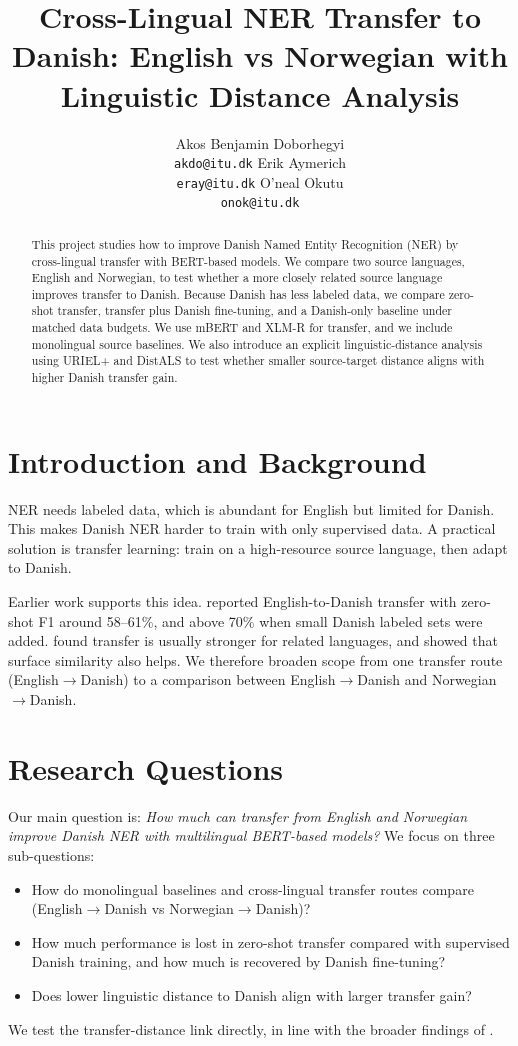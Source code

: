 \documentclass[11pt]{article}
\title{Cross-Lingual NER Transfer to Danish: English vs Norwegian with Linguistic Distance Analysis}
\author{Akos Benjamin Doborhegyi \\
  \texttt{akdo@itu.dk} \And
  Erik Aymerich \\
  \texttt{eray@itu.dk} \And
  O'neal Okutu \\
  \texttt{onok@itu.dk}}
\begin{document}
\maketitle

\begin{abstract}
This project studies how to improve Danish Named Entity Recognition (NER) by cross-lingual transfer with BERT-based models. We compare two source languages, English and Norwegian, to test whether a more closely related source language improves transfer to Danish. Because Danish has less labeled data, we compare zero-shot transfer, transfer plus Danish fine-tuning, and a Danish-only baseline under matched data budgets. We use mBERT and XLM-R for transfer, and we include monolingual source baselines. We also introduce an explicit linguistic-distance analysis using URIEL+ and DistALS to test whether smaller source-target distance aligns with higher Danish transfer gain.
\end{abstract}

\section{Introduction and Background}
NER needs labeled data, which is abundant for English but limited for Danish. This makes Danish NER harder to train with only supervised data. A practical solution is transfer learning: train on a high-resource source language, then adapt to Danish.

Earlier work supports this idea. \citet{plank2020danish} reported English-to-Danish transfer with zero-shot F1 around 58--61\%, and above 70\% when small Danish labeled sets were added. \citet{fu2023heterogeneous} found transfer is usually stronger for related languages, and \citet{sohn2024zeroshot} showed that surface similarity also helps. We therefore broaden scope from one transfer route (English$\rightarrow$Danish) to a comparison between English$\rightarrow$Danish and Norwegian$\rightarrow$Danish.

\section{Research Questions}
Our main question is: \textit{How much can transfer from English and Norwegian improve Danish NER with multilingual BERT-based models?} We focus on three sub-questions:
\begin{itemize}
  \item How do monolingual baselines and cross-lingual transfer routes compare (English$\rightarrow$Danish vs Norwegian$\rightarrow$Danish)?
  \item How much performance is lost in zero-shot transfer compared with supervised Danish training, and how much is recovered by Danish fine-tuning?
  \item Does lower linguistic distance to Danish align with larger transfer gain?
\end{itemize}
We test the transfer-distance link directly, in line with the broader findings of \citet{fu2023heterogeneous}.
\end{document}
